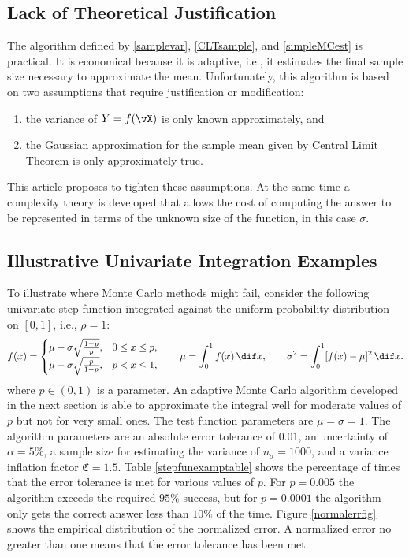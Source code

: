 \documentclass[graybox]{svmult}
\newcommand{\fudge}{\mathfrak{C}}
\begin{document}
\subsection{Lack of Theoretical Justification}
The algorithm defined by \eqref{samplevar}, \eqref{CLTsample}, and \eqref{simpleMCest} is practical.  It is economical because it is adaptive, i.e., it estimates the final sample size necessary to approximate the mean.  Unfortunately, this algorithm is based on two assumptions that require justification or modification:
\begin{enumerate}
\renewcommand{\labelenumi}{\roman{enumi})}
\item the variance of $Y=f(\vX)$ is only known approximately, and
\item the Gaussian approximation for the sample mean given by Central Limit Theorem is only approximately true.
\end{enumerate}
This article proposes to tighten these assumptions.  At the same time a complexity theory is developed that allows the cost of computing the answer to be represented in terms of the unknown size of the function, in this case $\sigma$.

\subsection{Illustrative Univariate Integration Examples}

To illustrate where Monte Carlo methods might fail, consider the following univariate step-function integrated against the uniform probability distribution on $[0,1]$, i.e., $\rho=1$:
\begin{equation} \label{exampleeq}
f(x) = \begin{cases} \mu + \sigma \sqrt{\frac{1-p}{p}}, & 0 \le x \le p,\\
\mu - \sigma \sqrt{\frac{p}{1-p}}, & p < x \le 1,
\end{cases} \qquad \mu=\int_0^1 f(x) \, \dif x, \qquad \sigma^2=\int_0^1 [f(x)-\mu]^2 \, \dif x.
\end{equation}
where $p \in (0,1)$ is a parameter.  An adaptive Monte Carlo algorithm developed in the next section is able to approximate the integral well for moderate values of $p$ but not for very small ones.  The test function parameters are $\mu=\sigma=1$.  The algorithm parameters are an absolute error tolerance of $0.01$, an uncertainty of $\alpha=5\%$, a sample size for estimating the variance of $n_\sigma=1000$, and a variance inflation factor $\fudge=1.5$.  Table \ref{stepfunexamptable} shows the percentage of times that the error tolerance is met for various values of $p$.  For $p=0.005$ the algorithm exceeds the required $95\%$ success, but for $p=0.0001$ the algorithm only gets the correct answer less than $10\%$ of the time.  Figure \ref{normalerrfig} shows the empirical distribution of the normalized error.  A normalized error no greater than one means that the error tolerance has been met.  
\end{document}
